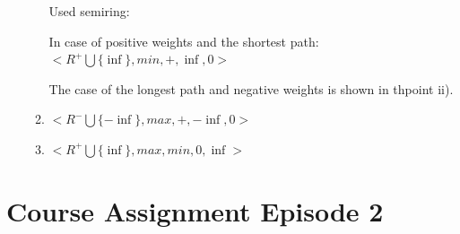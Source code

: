 \documentclass{article}
\begin{document}
\begin{enumerate}[label = (\alph*)]
\begin{enumerate}[label = (\roman*)]
    Used semiring: 
    
    In case of positive weights and the shortest path: $<R^+ \bigcup \{\inf\}, min, +, \inf, 0>$
    
    The case of the longest path and negative weights is shown in thpoint ii).     
    
    \item
    $<R^- \bigcup \{- \inf\}, max, +, -\inf, 0>$
    
    \item
    $<R^+ \bigcup \{\inf\}, max, min, 0, \inf>$
    
    \end{enumerate}
 	    
\end{enumerate}

\clearpage
\newpage
\part{Course Assignment Episode 2}
\end{document}
